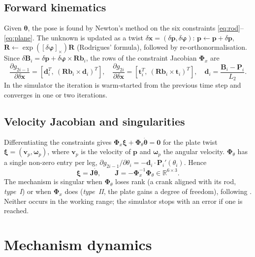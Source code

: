 \documentclass[10pt,a4paper]{article}
\newcommand{\vect}[1]{\bm{#1}}
\begin{document}
\subsection{Forward kinematics}
Given $\vect\theta$, the pose is found by Newton's method on the six constraints
\eqref{eq:rod}--\eqref{eq:plane}. The unknown is updated as a twist
$\delta\vect x=(\delta\vect p,\delta\vect\varphi)$: $\vect p\leftarrow\vect p+\delta\vect p$,
$\vect R\leftarrow\exp([\delta\vect\varphi]_\times)\vect R$ (Rodrigues' formula), followed by
re-orthonormalisation. Since $\delta\vect B_i=\delta\vect p+\delta\vect\varphi\times\vect R\vect b_i$,
the rows of the constraint Jacobian $\vect\Phi_x$ are
\begin{equation}
  \frac{\partial g_{2i-1}}{\partial\delta\vect x}=\left[\vect d_i^T,\ (\vect R\vect b_i\times\vect d_i)^T\right],\quad
  \frac{\partial g_{2i}}{\partial\delta\vect x}=\left[\vect t_i^T,\ (\vect R\vect b_i\times\vect t_i)^T\right],
  \quad \vect d_i=\frac{\vect B_i-\vect P_i}{L_2}.
\end{equation}
In the simulator the iteration is warm-started from the previous time step and converges in
one or two iterations.

\subsection{Velocity Jacobian and singularities}
Differentiating the constraints gives $\vect\Phi_x\vect\xi+\vect\Phi_\theta\dot{\vect\theta}=\vect 0$
for the plate twist $\vect\xi=(\vect v_p,\vect\omega_p)$, where $\vect v_p$ is the velocity of
$\vect p$ and $\vect\omega_p$ the angular velocity. $\vect\Phi_\theta$ has a single non-zero
entry per leg, $\partial g_{2i-1}/\partial\theta_i=-\vect d_i\cdot\vect P_i'(\theta_i)$. Hence
\begin{equation}
  \vect\xi=\vect J\dot{\vect\theta},\qquad \vect J=-\vect\Phi_x^{-1}\vect\Phi_\theta\in\mathbb R^{6\times3}.
\end{equation}
The mechanism is singular when $\vect\Phi_\theta$ loses rank (a crank aligned with its rod,
\emph{type~I}) or when $\vect\Phi_x$ does (\emph{type~II}, the plate gains a degree of
freedom), following \citet{gosselin1990singularity}. Neither occurs in the working range; the
simulator stops with an error if one is reached.

\section{Mechanism dynamics}\label{sec:dynamics}
\end{document}
